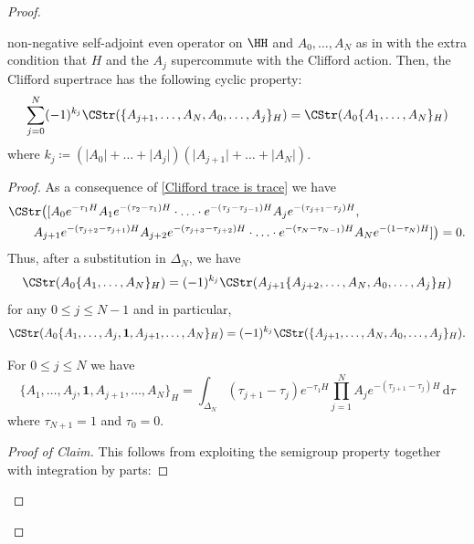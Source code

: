 \documentclass[a4paper, english, 12pt, bibliography=totocnumbered,
index=totoc]{scrartcl}
\begin{document}
\begin{proof}
\begin{lem}
		non-negative self-adjoint even
		operator on $\HH$ and $A_0, \ldots, A_N$ as in \cite[Lemma
		4.2]{GüneysuLudewig} with
		the extra condition that $H$ and the $A_j$ supercommute with the
		Clifford action.
		Then, the Clifford supertrace has the following cyclic property:
		\begin{equation*}
			\sum_{j = 0}^N (-1)^{k_j}\CStr(\{A_{j+1}, \ldots, A_N, A_0,
			\ldots,
			A_j\}_H) =
			\CStr(A_0 \{A_1, \ldots, A_N\}_H)
		\end{equation*}
		where $k_j \coloneqq (\lvert A_0 \rvert + \ldots + \lvert A_j
		\rvert)(\lvert A_{j+1} \rvert + \ldots + \lvert A_N \rvert)$.
	\end{lem}
	\begin{proof}
		As a consequence of \cref{Clifford trace is trace} we have
		\begin{align*}
			& \CStr\big([A_0 e^{-\tau_1 H}A_1 e^{-(\tau_2 - \tau_1)H} \cdot
			\ldots
			\cdot
			e^{-(\tau_j
				- \tau_{j-1})H} A_j e^{-(\tau_{j+1} - \tau_j)H}, \\
			& \qquad A_{j+1} e^{-(\tau_{j+2} - \tau_{j+1}) H}A_{j+2}
			e^{-(\tau_{j+3} - \tau_{j+2})H} \cdot \ldots \cdot e^{-(\tau_N
				- \tau_{N-1})H} A_N e^{-(1-\tau_N)H}]\big) = 0.
		\end{align*}
		Thus, after a substitution in $\Delta_N$, we have
		\begin{equation*}
			\CStr(A_0 \{A_1, \ldots, A_N\}_H) = (-1)^{k_j}\CStr(A_{j+1}
			\{A_{j+2},
			\ldots,
			A_N, A_0, \ldots, A_j\}_H)
		\end{equation*}
		for any $0 \leq j \leq N-1$ and in particular,
		\begin{equation}\label{Trace cyclic with 1}
			\CStr(A_0 \{A_1, \ldots, A_j, \mathbf{1}, A_{j+1}, \ldots,
			A_N\}_H) =
			(-1)^{k_j}\CStr(\{A_{j+1}, \ldots, A_N,
			A_0, \ldots, A_j\}_H).
		\end{equation}
		\begin{claim}
			For $0 \leq j \leq N$ we have
			\begin{equation*}
				\{A_1, \ldots, A_j, \mathbf{1}, A_{j+1}, \ldots, A_N\}_H =
				\int_{\Delta_N} (\tau_{j+1} - \tau_j) e^{-\tau_1 H}
				\prod_{j=1}^{N}
				A_j e^{-(\tau_{j+1} - \tau_j)H} \, \mathrm{d} \tau
			\end{equation*}
			where $\tau_{N+1} = 1$ and $\tau_0 = 0$.
		\end{claim}
		\begin{proof}[Proof of Claim]
			This follows from exploiting the semigroup property together with
			integration by parts:
			\footnotesize

\end{proof}
\end{proof}
\end{proof}
\end{document}
